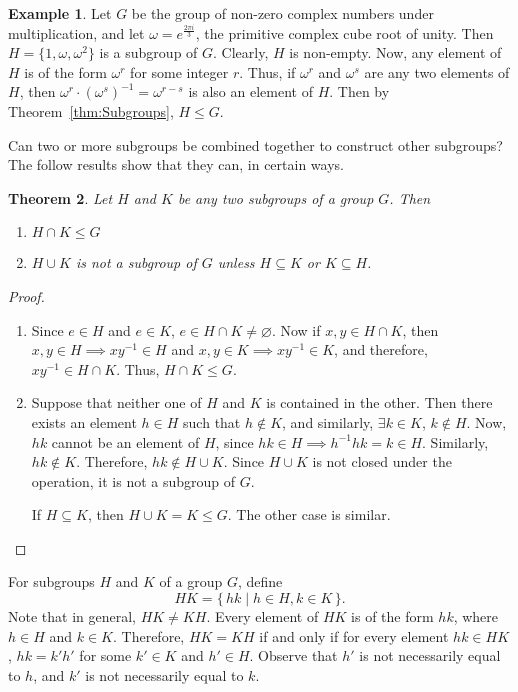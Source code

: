 \documentclass[svgnames]{article}
\newtheorem{Theorem}{Theorem}[section]
\theoremstyle{definition}
\newtheorem{Example}[Theorem]{Example}
\theoremstyle{remark}
\begin{document}
\begin{Example}
Let $G$ be the group of non-zero complex numbers under multiplication, and let $\omega = e^{\frac{2\pi i}{3}}$, the primitive complex cube root of unity. Then $H = \{1, \omega, \omega^2\}$ is a subgroup of $G$. Clearly, $H$ is non-empty. Now, any element of $H$ is of the form $\omega^r$ for some integer $r$. Thus, if $\omega^r$ and $\omega^s$ are any two elements of $H$, then $\omega^r \cdot (\omega^s)^{-1}  = \omega^{r - s}$ is also an element of $H$. Then by Theorem~\ref{thm:Subgroups}, $H \le G$.
\end{Example}

Can two or more subgroups be combined together to construct other subgroups? The follow results show that they can, in certain ways.
\begin{Theorem}\label{thm:SubgroupsIntUni}
Let $H$ and $K$ be any two subgroups of a group $G$. Then
\begin{enumerate}
\item $H \cap K \le G$
\item $H \cup K$ is not a subgroup of $G$ unless $H \subseteq K$ or $K \subseteq H$.
\end{enumerate}
\end{Theorem}
\begin{proof}
\begin{enumerate}
\item Since $e \in H$ and $e \in K$, $e \in H \cap K \ne \varnothing$. Now if $x, y \in H \cap K$, then $x, y \in H \implies xy^{-1} \in H$ and $x, y \in K \implies xy^{-1} \in K$, and therefore, $xy^{-1} \in H \cap K$. Thus, $H \cap K \le G$.
\item Suppose that neither one of $H$ and $K$ is contained in the other. Then there exists an element $h \in H$ such that $h \notin K$, and similarly, $\exists k \in K$, $k \notin H$. Now, $hk$ cannot be an element of $H$, since $hk \in H \implies h^{-1}hk = k \in H$. Similarly, $hk \notin K$. Therefore, $hk \notin H \cup K$. Since $H \cup K$ is not closed under the operation, it is not a subgroup of $G$.

If $H \subseteq K$, then $H \cup K = K \le G$. The other case is similar.
\end{enumerate}
\end{proof}

\label{def:HK} For subgroups $H$ and $K$ of a group $G$, define
\begin{equation*}
HK = \{\, hk \mid h \in H, k \in K \,\}.
\end{equation*}
Note that in general, $HK \ne KH$. Every element of $HK$ is of the form $hk$, where $h \in H$ and $k \in K$. Therefore, $HK = KH$ if and only if for every element $hk \in HK$, $hk = k'h'$ for some $k' \in K$ and $h' \in H$. Observe that $h'$ is not necessarily equal to $h$, and $k'$ is not necessarily equal to $k$.
\end{document}
